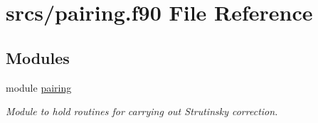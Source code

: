 \hypertarget{pairing_8f90}{}\section{srcs/pairing.f90 File Reference}
\label{pairing_8f90}
\subsection*{Modules}
\begin{DoxyCompactItemize}
\item 
module \mbox{\hyperlink{namespacepairing}{pairing}}
\begin{DoxyCompactList}\small\item\em Module to hold routines for carrying out Strutinsky correction. \end{DoxyCompactList}\end{DoxyCompactItemize}
